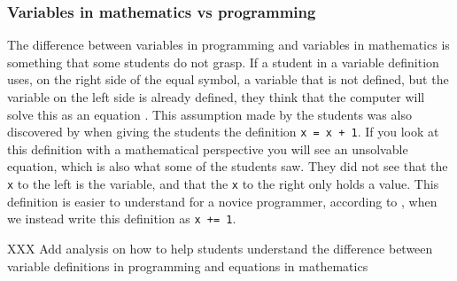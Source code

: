 \subsubsection{Variables in mathematics vs programming}

The difference between variables in programming and variables in 
mathematics is something that some students do not grasp. If a student in a 
variable 
definition uses, on the right side of the equal symbol, a variable that is 
not 
defined, but the variable on the left side is already defined, they think 
that 
the computer will solve this as an equation \parencite{Plass2015Variables}. 
This assumption made by the students was also discovered by 
\textcite{Kohn2017VariableEvaluation} when giving the students the 
definition 
\texttt{x = x + 1}. If you look at this definition with a mathematical 
perspective you will see an unsolvable equation, which is also what some of 
the 
students saw. They did not see that the \texttt{x} to the left is the 
variable, 
and that the \texttt{x} to the right only holds a value. This definition is  
easier to understand for a novice programmer, according to 
\textcite{Kohn2017VariableEvaluation}, when we instead write this 
definition as 
\texttt{x += 1}. 

XXX Add analysis on how to help students understand the difference between 
variable definitions in programming and equations in mathematics


